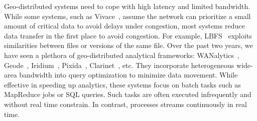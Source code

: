  Geo-distributed systems need to cope with high latency
and limited bandwidth. While some systems, such as
Vivace~\cite{cho2012surviving}, assume the network can prioritize a small amount
of critical data to avoid delays under congestion, most systems reduce data
transfer in the first place to avoid congestion. For example,
LBFS~\cite{muthitacharoen2001low} exploits similarities between files or
versions of the same file. Over the past two years, we have seen a plethora of
geo-distributed analytical frameworks:
WANalytics~\cite{vulimiri2015wananlytics}, Geode~\cite{vulimiri2015global},
Iridium~\cite{pu2015low}, Pixida~\cite{kloudas2015pixida},
Clarinet~\cite{viswanathan2016clarinet}, etc. They incorporate heterogeneous
wide-area bandwidth into query optimization to minimize data movement. While
effective in speeding up analytics, these systems focus on batch tasks such as
MapReduce jobs or SQL queries. Such tasks are often executed infrequently and
without real time constrain. In contrast, \sysname{} processes streams
continuously in real time.









